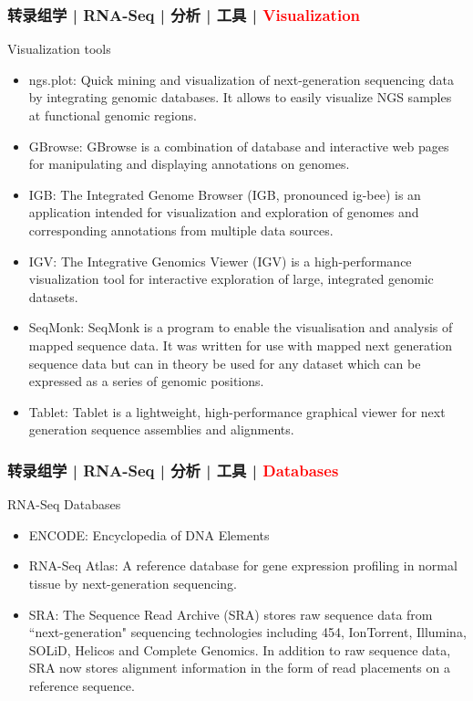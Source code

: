 \begin{frame}
  \frametitle{转录组学 | RNA-Seq | 分析 | 工具 | \textcolor{red}{Visualization}}
  {\footnotesize
  \begin{block}{Visualization tools}
    \begin{itemize}
      \item ngs.plot: Quick mining and visualization of next-generation sequencing data by integrating genomic databases. It allows to easily visualize NGS samples at functional genomic regions.
      \item GBrowse: GBrowse is a combination of database and interactive web pages for manipulating and displaying annotations on genomes.
      \item IGB: The Integrated Genome Browser (IGB, pronounced ig-bee) is an application intended for visualization and exploration of genomes and corresponding annotations from multiple data sources. 
      \item IGV: The Integrative Genomics Viewer (IGV) is a high-performance visualization tool for interactive exploration of large, integrated genomic datasets.
      \item SeqMonk: SeqMonk is a program to enable the visualisation and analysis of mapped sequence data. It was written for use with mapped next generation sequence data but can in theory be used for any dataset which can be expressed as a series of genomic positions.
      \item Tablet: Tablet is a lightweight, high-performance graphical viewer for next generation sequence assemblies and alignments.
    \end{itemize}
  \end{block}
  }
\end{frame}

\begin{frame}
  \frametitle{转录组学 | RNA-Seq | 分析 | 工具 | \textcolor{red}{Databases}}
  \begin{block}{RNA-Seq Databases}
    \begin{itemize}
      \item ENCODE: Encyclopedia of DNA Elements
      \item RNA-Seq Atlas: A reference database for gene expression profiling in normal tissue by next-generation sequencing.
      \item SRA: The Sequence Read Archive (SRA) stores raw sequence data from ``next-generation" sequencing technologies including 454, IonTorrent, Illumina, SOLiD, Helicos and Complete Genomics. In addition to raw sequence data, SRA now stores alignment information in the form of read placements on a reference sequence.
    \end{itemize}
  \end{block}
\end{frame}

